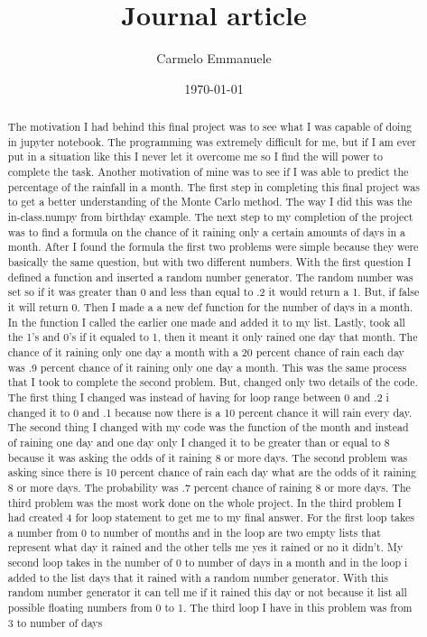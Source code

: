 \documentclass[twocolumn]{revtex4}
\begin{document}
\title{
Journal article
}

\author{Carmelo Emmanuele}

\date{\today}

\begin{abstract}

    The motivation I had behind this final project was to see what I was capable of doing in jupyter notebook.  The programming was 	                       extremely difficult for me, but if I am ever put in a situation like this I never let it overcome me so I find the will power to complete the task.  Another motivation of mine was to see if I was able to predict the percentage of the rainfall in a month.  The first step in completing this final project was to get a better understanding of the Monte Carlo method.  The way I did this was the in-class.numpy from birthday example.  The next step to my completion of the project was to find a formula on the chance of it raining only a certain amounts of days in a month.  After I found the formula the first two problems were simple because they were basically the same question, but with two different numbers.  With the first question I defined a function and inserted a random number generator. The random number was set so if it was greater than 0 and less than equal to .2 it would return a 1.  But, if false it will return 0.  Then I made a a new def function for the number of days in a month.  In the function I called the earlier one made and added it to my list.  Lastly, took all the 1's and 0's if it equaled to 1, then it meant it only rained one day that month.  The chance of it raining only one day a month with a 20 percent chance of rain each day was .9 percent chance of it raining only one day a month.  This was the same process that I took to complete the second problem.  But, changed only two details of the code.  The first thing I changed was instead of having for loop range between 0 and .2 i changed it to 0 and .1 because now there is a 10 percent chance it will rain every day.   The second thing I changed with my code was the function of the month and instead of raining one day and one day only I changed it to be greater than or equal to 8 because it was asking the odds of it raining 8 or more days.  The second problem was asking since there is 10 percent chance of rain each day what are the odds of it raining 8 or more days.  The probability was .7 percent chance of raining 8 or more days.  The third problem was the most work done on the whole project.  In the third problem I had created 4 for loop statement to get me to my final answer.  For the first loop takes a number from 0 to number of months and in the loop are two empty lists that represent what day it rained and the other tells me yes it rained or no it didn't.  My second loop takes in the number of 0 to number of days in a month and in the loop i added to the list days that it rained with a random number generator.  With this random number generator it can tell me if it rained this day or not because it list all possible floating numbers from 0 to 1.  The third loop I have in this problem was from 3 to number of days 
\end{abstract}
\end{document}
